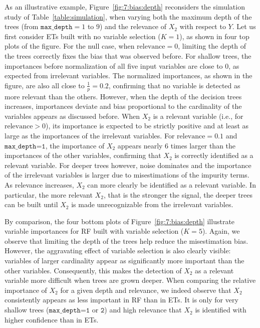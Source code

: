 As an illustrative example, Figure~\ref{fig:7:bias:depth} reconsiders the
simulation study of Table~\ref{table:simulation}, when varying both the maximum
depth of the trees (from $\texttt{max\_depth}=1$ to $9$) and the relevance of
$X_2$ with respect to $Y$.  Let us first consider ETs  built with no variable
selection ($K=1$), as shown in four top plots of the figure. For the null case,
when $\text{relevance}=0$, limiting the depth of the trees correctly fixes the
bias that was observed before. For shallow trees, the importances before
normalization of all five input variables are close to 0, as expected from
irrelevant variables. The normalized importances, as shown in the figure, are
also all close to $\tfrac{1}{p}=0.2$, confirming that no variable is detected
as more relevant than the others. However, when the depth of the decision trees
increases, importances deviate and bias proportional to the cardinality of the
variables appears as discussed before. When $X_2$ is a relevant variable (i.e.,
for $\text{relevance}>0$), its importance is expected to be strictly positive
and at least as large as the importances of the irrelevant variables. For
$\text{relevance}=0.1$ and $\texttt{max\_depth=1}$, the importance of $X_2$
appears nearly $6$ times larger than the importances of the other variables,
confirming that $X_2$ is correctly identified as a relevant variable.  For
deeper trees  however, noise dominates and the importance of the irrelevant
variables is larger due to misestimations of the impurity terms. As  relevance
increases, $X_2$ can more clearly be identified as a relevant variable. In
particular, the more relevant $X_2$, that is the stronger the signal, the
deeper trees can be built until $X_2$ is made unrecognizable from the
irrelevant variables.

By comparison, the four bottom plots of Figure~\ref{fig:7:bias:depth}
illustrate variable importances for RF built with variable selection ($K=5$).
Again, we observe that limiting the depth of the trees help reduce the
misestimation bias. However, the aggravating effect of variable selection is
also clearly visible: variables of larger cardinality appear as significantly
more important than the other variables. Consequently, this makes the
detection of  $X_2$ as a relevant variable more difficult when trees are grown
deeper. When comparing the relative importance of $X_2$ for a given depth and
relevance, we indeed observe that $X_2$ consistently appears as less important
in RF than in ETs. It is only for very shallow trees ($\texttt{max\_depth=1}$
or $\texttt{2}$) and high relevance that $X_2$ is identified with higher
confidence than in ETs.

